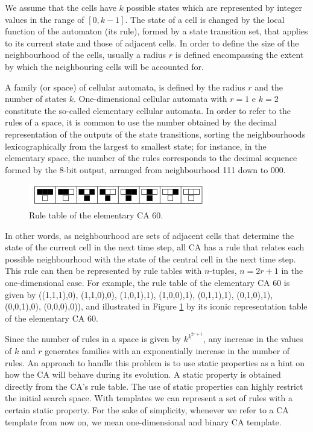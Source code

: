 \documentclass{llncs}
\begin{document}
We assume that the cells have $k$ possible states which are represented by integer values in the range of $[0, k-1]$. The state of a cell is changed by the local function of the automaton (its rule), formed by a state transition set, that applies to its current state and those of adjacent cells. In order to define the size of the neighbourhood of the cells, usually a radius $r$ is defined encompassing the extent by which the neighbouring cells will be accounted for.

A family (or space) of cellular automata, is defined by the radius $r$ and the number of states $k$. One-dimensional cellular automata with $r=1$ e $k=2$ constitute the so-called elementary cellular automata. In order to refer to the rules of a space, it is common to use the number obtained by the decimal representation of the outputs of the state transitions, sorting the neighbourhoods lexicographically from the largest to smallest state; for instance, in the elementary space, the number of the rules corresponds to the decimal sequence formed by the 8-bit output, arranged from neighbourhood 111 down to 000. 

\begin{figure}
  \centering
  \includegraphics[width=0.7\textwidth]{fig_ruleIcon60.png}
  \caption{Rule table of the elementary CA 60.}
  \label{fig:table60}
\end{figure}

In other words, as neighbourhood are sets of adjacent cells that determine the state of the current cell in the next time step, all CA has a rule that relates each possible neighbourhood with the state of the central cell in the next time step. This rule can then be represented by rule tables with $n$-tuples, $n = 2r + 1$  in the one-dimensional case. For example, the rule table of the elementary CA 60 is given by 
((1,1,1),0), (1,1,0),0), (1,0,1),1), (1,0,0),1), (0,1,1),1), (0,1,0),1), (0,0,1),0), (0,0,0),0)), and illustrated in Figure \ref{fig:table60} by its iconic representation table of the elementary CA 60.

Since the number of rules in a space is given by $k^{k^{2r+1}}$, any increase in the values of $k$ and $r$ generates families with an exponentially increase in the number of rules. An approach to handle this problem is to use static properties as a hint on how the CA will behave during its evolution. A static property is obtained directly from the CA's rule table. The use of static properties can highly restrict the initial search space. With templates we can represent a set of rules with a certain static property. For the sake of simplicity, whenever we refer to a CA template from now on, we mean one-dimensional and binary CA template.
\end{document}
